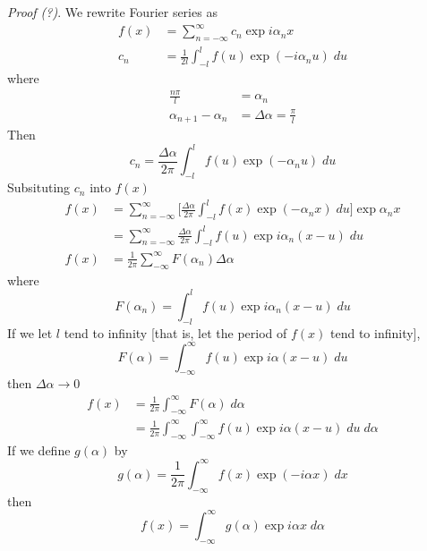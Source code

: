\documentclass[../../../main.tex]{subfiles}
\begin{document}
\emph{Proof (?)}. We rewrite Fourier series as
\begin{align*}
    f(x) & =\sum_{n=-\infty}^{\infty}c_n \exp i\alpha_n x          \\
    c_n  & =\frac{1}{2l}\int_{-l}^{l}  f(u)\exp( -i\alpha_n u)\;du
\end{align*}
where
\begin{align*}
    \frac{n\pi}{l}        & =\alpha_n                    \\
    \alpha_{n+1}-\alpha_n & =\Delta \alpha=\frac{\pi}{l}
\end{align*}
Then
\begin{equation*}
    c_n=\frac{\Delta\alpha}{2\pi}\int_{-l}^{l}  f(u)\exp( -\alpha_n u)\;du
\end{equation*}
Subsituting $c_n$ into $f(x)$
\begin{align*}
    f(x) & =\sum_{n=-\infty}^{\infty}\bigg[\frac{\Delta\alpha}{2\pi}\int_{-l}^{l}  f(x)\exp( -\alpha_n x)\;du\bigg]\exp\alpha_n x \\
         & =\sum_{n=-\infty}^{\infty}\frac{\Delta\alpha}{2\pi}\int_{-l}^{l}  f(u)\exp i\alpha_n (x-u)\;du                         \\
    f(x) & =\frac{1}{2\pi}\sum_{-\infty}^{\infty}F(\alpha_n)\Delta\alpha
\end{align*}
where
\begin{equation*}
    F(\alpha_n)=\int_{-l}^{l}  f(u)\exp i\alpha_n (x-u)\;du
\end{equation*}
If we let $l$ tend to inﬁnity [that is, let the period of $f(x)$ tend to inﬁnity],
\begin{equation*}
    F(\alpha)=\int_{-\infty}^{\infty}  f(u)\exp i\alpha (x-u)\;du
\end{equation*}
then $\Delta \alpha\rightarrow 0$
\begin{align*}
    f(x) & =\frac{1}{2\pi}\int_{-\infty}^{\infty}F(\alpha)\; d\alpha                                           \\
         & =\frac{1}{2\pi}\int_{-\infty}^{\infty}\int_{-\infty}^{\infty}  f(u)\exp i\alpha (x-u)\;du \;d\alpha
\end{align*}
If we deﬁne $g(\alpha)$ by
\begin{equation*}
    g(\alpha)=\frac{1}{2\pi}\int_{-\infty}^{\infty}f(x)\exp (-i\alpha x)\;dx
\end{equation*}
then
\begin{equation*}
    f(x)=\int_{-\infty}^{\infty}g(\alpha)\exp i\alpha x\; d\alpha
\end{equation*}
\end{document}
